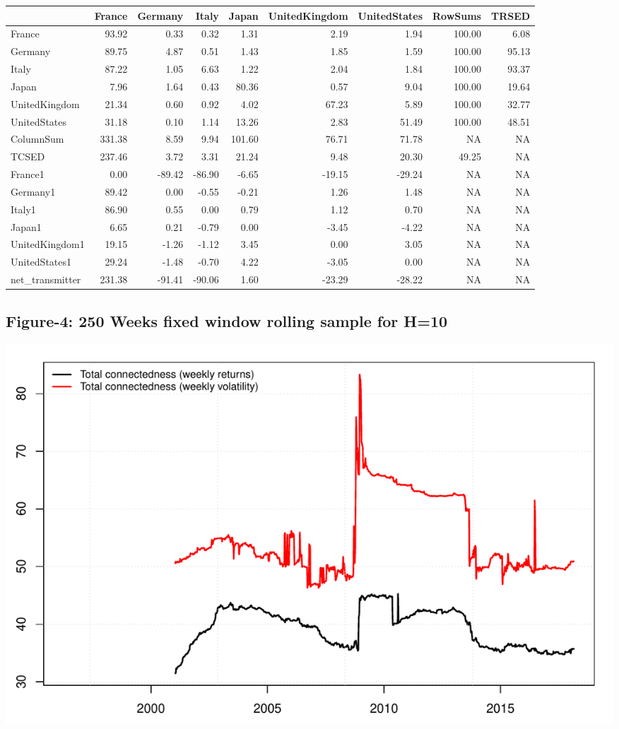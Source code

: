 \documentclass[]{elsarticle} %
\makeatletter
\def\maxwidth{\ifdim\Gin@nat@width>\linewidth\linewidth
\else\Gin@nat@width\fi}
\let\Oldincludegraphics\includegraphics
\renewcommand{\includegraphics}[1]{\Oldincludegraphics[width=\maxwidth]{#1}}
\makeatother
\begin{document}
\begin{tabular}{lrrrrrrrr}
\toprule
  & France & Germany & Italy & Japan & UnitedKingdom & UnitedStates & RowSums & TRSED\\
\midrule
France & 93.92 & 0.33 & 0.32 & 1.31 & 2.19 & 1.94 & 100.00 & 6.08\\
Germany & 89.75 & 4.87 & 0.51 & 1.43 & 1.85 & 1.59 & 100.00 & 95.13\\
Italy & 87.22 & 1.05 & 6.63 & 1.22 & 2.04 & 1.84 & 100.00 & 93.37\\
Japan & 7.96 & 1.64 & 0.43 & 80.36 & 0.57 & 9.04 & 100.00 & 19.64\\
UnitedKingdom & 21.34 & 0.60 & 0.92 & 4.02 & 67.23 & 5.89 & 100.00 & 32.77\\
\addlinespace
UnitedStates & 31.18 & 0.10 & 1.14 & 13.26 & 2.83 & 51.49 & 100.00 & 48.51\\
ColumnSum & 331.38 & 8.59 & 9.94 & 101.60 & 76.71 & 71.78 & NA & NA\\
TCSED & 237.46 & 3.72 & 3.31 & 21.24 & 9.48 & 20.30 & 49.25 & NA\\
France1 & 0.00 & -89.42 & -86.90 & -6.65 & -19.15 & -29.24 & NA & NA\\
Germany1 & 89.42 & 0.00 & -0.55 & -0.21 & 1.26 & 1.48 & NA & NA\\
\addlinespace
Italy1 & 86.90 & 0.55 & 0.00 & 0.79 & 1.12 & 0.70 & NA & NA\\
Japan1 & 6.65 & 0.21 & -0.79 & 0.00 & -3.45 & -4.22 & NA & NA\\
UnitedKingdom1 & 19.15 & -1.26 & -1.12 & 3.45 & 0.00 & 3.05 & NA & NA\\
UnitedStates1 & 29.24 & -1.48 & -0.70 & 4.22 & -3.05 & 0.00 & NA & NA\\
net\_transmitter & 231.38 & -91.41 & -90.06 & 1.60 & -23.29 & -28.22 & NA & NA\\
\bottomrule
\end{tabular}

\subsection{\texorpdfstring{\textbf{Figure-4: 250 Weeks fixed window
rolling sample for
H=10}}{Figure-4: 250 Weeks fixed window rolling sample for H=10}}\label{figure-4-250-weeks-fixed-window-rolling-sample-for-h10}

\includegraphics{Main_files/figure-latex/unnamed-chunk-8-1.pdf}
\end{document}
